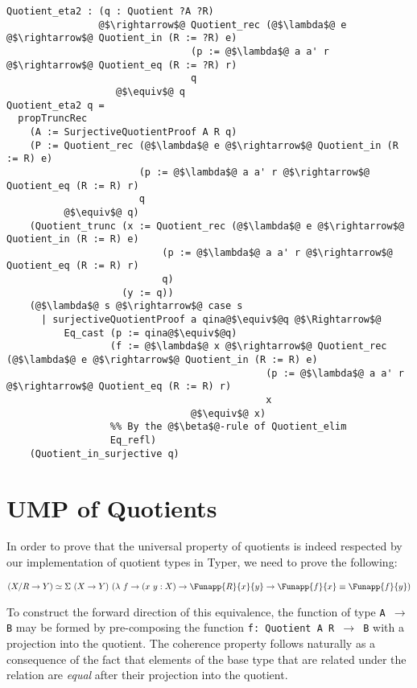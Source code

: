 \documentclass[12pt,twoside,maitrise]{dms}
\theoremstyle{definition}
\numberwithin{equation}{section}
\numberwithin{table}{chapter}
\numberwithin{figure}{chapter}
\newcommand\fn[1] {\texttt{#1}}
\begin{document}
\begin{verbatim}
Quotient_eta2 : (q : Quotient ?A ?R)
                @$\rightarrow$@ Quotient_rec (@$\lambda$@ e @$\rightarrow$@ Quotient_in (R := ?R) e)
                                (p := @$\lambda$@ a a' r @$\rightarrow$@ Quotient_eq (R := ?R) r)
                                q
                   @$\equiv$@ q
Quotient_eta2 q =
  propTruncRec
    (A := SurjectiveQuotientProof A R q)
    (P := Quotient_rec (@$\lambda$@ e @$\rightarrow$@ Quotient_in (R := R) e)
                       (p := @$\lambda$@ a a' r @$\rightarrow$@ Quotient_eq (R := R) r)
                       q
          @$\equiv$@ q)
    (Quotient_trunc (x := Quotient_rec (@$\lambda$@ e @$\rightarrow$@ Quotient_in (R := R) e)
                           (p := @$\lambda$@ a a' r @$\rightarrow$@ Quotient_eq (R := R) r)
                           q)
                    (y := q))
    (@$\lambda$@ s @$\rightarrow$@ case s
      | surjectiveQuotientProof a qina@$\equiv$@q @$\Rightarrow$@
          Eq_cast (p := qina@$\equiv$@q)
                  (f := @$\lambda$@ x @$\rightarrow$@ Quotient_rec (@$\lambda$@ e @$\rightarrow$@ Quotient_in (R := R) e)
                                             (p := @$\lambda$@ a a' r @$\rightarrow$@ Quotient_eq (R := R) r)
                                             x
                                @$\equiv$@ x)
                  %% By the @$\beta$@-rule of Quotient_elim
                  Eq_refl)
    (Quotient_in_surjective q)
\end{verbatim}

\section{UMP of Quotients}\label{app:ump-quot}

In order to prove that the universal property of quotients is indeed respected by our
implementation of quotient types in Typer, we need to prove the following:

\begin{align*}
  & (X/R \rightarrow Y) \simeq \Sigma \ (X \rightarrow Y) \ (\lambda \ f \rightarrow (x \ y : X) \rightarrow \Funapp{R}{x}{y} \rightarrow \Funapp{f}{x} \equiv \Funapp{f}{y}) \\
\end{align*}

To construct the forward direction of this equivalence, the function of type
\fn{A $\rightarrow$ B} may be formed by pre-composing the function \fn{f:
  Quotient A R $\rightarrow$ B} with a projection into the quotient. The
coherence property follows naturally as a consequence of the fact that elements
of the base type that are related under the relation are \emph{equal} after
their projection into the quotient.
\end{document}
